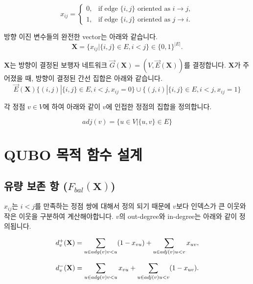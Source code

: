 \documentclass[11pt,a4paper]{article}
\begin{document}
\begin{equation}
x_{ij} =
    \begin{cases}
    0, & \text{if edge } \{i, j\}  \text{ oriented as } i \to j,\\
    1, & \text{if edge } \{i, j\}  \text{ oriented as } j \to i.
    \end{cases}
\end{equation}

방향 이진 변수들의 완전한 vector는 아래와 같습니다.
\begin{equation}
\mathbf{X} = \{x_{ij}  |  \{i, j\} \in E,  i < j\}  \in  \{0, 1\}^{|E|}.
\end{equation}

$\mathbf{X}$는 방향이 결정된 보행자 네트워크 $\vec{G}(\mathbf{X}) = (V, \vec{E}(\mathbf{X}))$를 결정합니다. $\mathbf{X}$가 주어졌을 때, 방향이 결정된 간선 집합은 아래와 같습니다.
\begin{equation}
\vec{E}(\mathbf{X}) \{(i, j)  | \{i, j\} \in E,  i < j,  x_{ij} = 0\}
\cup \{(j, i)  |  \{i, j\} \in E,  i < j,  x_{ij} = 1\}
\end{equation}

각 정점 $v \in V$에 하여 아래와 같이  $v$에 인접한 정점의 집합을 정의합니다.

\begin{equation}
adj(v) = \{u \in V  |  \{u, v\} \in E\}
\end{equation}

\section{QUBO 목적 함수 설계}

\subsection{유량 보존 항 ($F_{bal}(\mathbf{X})$)}
$x_{ij}$는 $i < j$를 만족하는 정점 쌍에 대해서 정의 되기 때문에 $v$보다 인덱스가 큰 이웃와 작은 이웃을 구분하여 계산해야합니다.
$v$의 out-degree와 in-degree는 아래와 같이 정의됩니다.

\begin{equation}
d_v^+ (\mathbf{X}) = \sum_{u \in adg(v) \\ v<u} (1 - x_{vu}) + \sum_{u \in adj(v) \\ u < v} x_{uv},
\end{equation}

\begin{equation}
d_v^- (\mathbf{X}) = \sum_{u \in adg(v) \\ v<u} x_{vu} + \sum_{u \in adj(v) \\ u < v}(1 - x_{uv}).
\end{equation}
\end{document}
